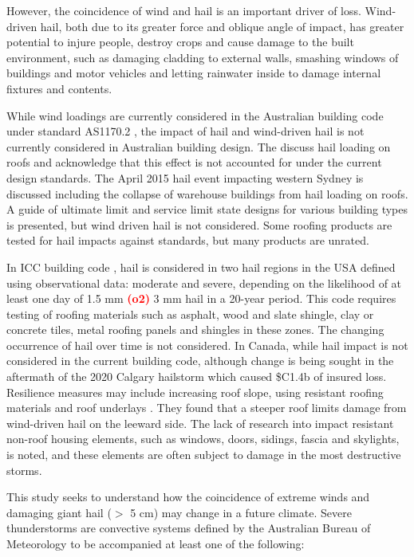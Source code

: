 \documentclass[]{agujournal2019}\usepackage[]{graphicx}\usepackage[]{xcolor}
\newcommand*{\todo}[1]{\textbf{\textcolor{red}{(#1)}}}
\begin{document}
However, the coincidence of wind and hail is an important driver of loss. Wind-driven hail, both due to its greater force and oblique angle of impact, has greater potential to injure people, destroy crops \cite{Changnon_JAMC_1967, Towery_JAMC_1976} and cause damage to the built environment, such as damaging cladding to external walls, smashing windows of buildings and motor vehicles and letting rainwater inside to damage internal fixtures and contents.

While wind loadings are currently considered in the Australian building code \cite{ABCB_2024} under standard AS1170.2 \cite{Standards_2021}, the impact of hail and wind-driven hail is not currently considered in Australian building design. The  discuss hail loading on roofs and acknowledge that this effect is not accounted for under the current design standards. The April 2015 hail event impacting western Sydney is discussed including the collapse of warehouse buildings from hail loading on roofs. A guide of ultimate limit and service limit state designs for various building types is presented, but wind driven hail is not considered. Some roofing products are tested for hail impacts against standards, but many products are unrated.

In ICC building code \cite{ICC_2008}, hail is considered in two hail regions in the USA defined using observational data: moderate and severe, depending on the likelihood of at least one day of 1.5 mm \todo{o2} 3 mm hail in a 20-year period. This code requires testing of roofing materials such as asphalt, wood and slate shingle, clay or concrete tiles, metal roofing panels and shingles in these zones. The changing occurrence of hail over time is not considered. In Canada, while hail impact is not considered in the current building code, although change is being sought in the aftermath of the 2020 Calgary hailstorm which caused \$C1.4b of insured loss. Resilience measures may include increasing roof slope, using resistant roofing materials and roof underlays \cite{ICLR_2018}. They found that a steeper roof limits damage from wind-driven hail on the leeward side. The lack of research into impact resistant non-roof housing elements, such as windows, doors, sidings, fascia and skylights, is noted, and these elements are often subject to damage in the most destructive storms.

This study seeks to understand how the coincidence of extreme winds and damaging giant hail ($>$ 5 cm) may change in a future climate. Severe thunderstorms are convective systems defined by the Australian Bureau of Meteorology to be accompanied at least one of the following:
\end{document}
